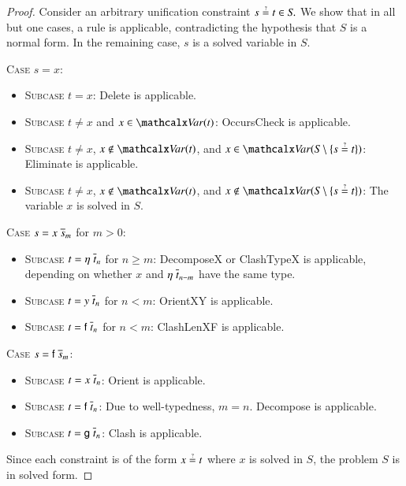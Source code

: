   \begin{proof}
    Consider an arbitrary unification constraint $s \unif t \in \mathit{S}.$ We show
    that in all but one cases, a rule is applicable, contradicting the
    hypothesis that $\mathit{S}$ is a normal form. In the remaining case, $s$ is a
    solved variable in $\mathit{S}$.

    \medskip
    \noindent
    \textsc{Case} $s = x$:
    \begin{itemize}
    \item \textsc{Subcase} $t = x$:
      \textsf{Delete} is applicable.

    \item \textsc{Subcase} $t \neq x$ and $x \in \Var(t)$:
      \textsf{OccursCheck} is applicable.

    \item \textsc{Subcase} $t \neq x$, $x \not \in \Var(t)$, and $x \in
      \Var(\mathit{S} \setminus \{ s \unif t \})$:
      \textsf{Eliminate} is applicable.

    \item \textsc{Subcase} $t \neq x$, $x \not \in \Var(t)$,
          and $x \notin \Var(\mathit{S} \setminus \{ s \unif t \})$:
      The variable $x$ is solved in $\mathit{S}$.
    \end{itemize}

    \noindent
    \textsc{Case} $s = x \; \overline{s}_{m}$ for $m > 0$:
    \begin{itemize}
    \item \textsc{Subcase} $t = \eta \; \overline{t}_{n}$ for $n \ge m$:
      \textsf{DecomposeX} or \textsf{Clash\-TypeX} is applicable, depending on
      whether $x$ and $\eta \; \overline{t}_{{n-m}}$ have the same type.

    \item \textsc{Subcase} $t = y \; \overline{t}_{n}$ for $n < m$:
      \textsf{OrientXY} is applicable.

    \item \textsc{Subcase} $t = \mathsf{f} \; \overline{t}_{n}$ for $n < m$:
      \textsf{ClashLenXF} is applicable.
    \end{itemize}

    \noindent
    \textsc{Case} $s = \mathsf{f} \; \overline{s}_{m}$:
    \begin{itemize}
    \item \textsc{Subcase} $t = x \; \overline{t}_{n}$:
      \textsf{Orient} is applicable.

    \item \textsc{Subcase} $t = \mathsf{f} \; \overline{t}_{n}$:
      Due to well-typedness, $m = n$. \textsf{Decompose} is
      applicable.

    \item \textsc{Subcase} $t = \mathsf{g} \; \overline{t}_{n}$:
      \textsf{Clash} is applicable.
    \end{itemize}

    \noindent
    Since each constraint is of the form $x \unif t$ where $x$ is solved in
    $\mathit{S}$, the problem $\mathit{S}$ is in solved form.
  \end{proof}


